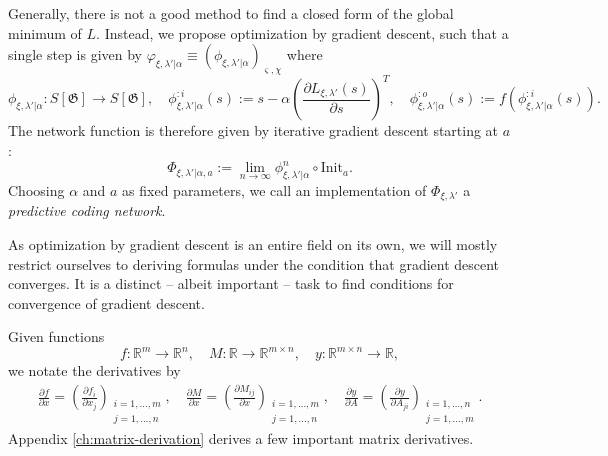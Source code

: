 \documentclass[a4paper,11pt]{report}
\newcommand{\const}{\varsigma} %
\newcommand{\var}{\chi} %
\newcommand{\In}{\text{Init}}
\begin{document}
\begin{Par}
Generally, there is not a good method to find a closed form of the global minimum of $L$. Instead, we propose optimization by gradient descent, such that a single step is given by $\varphi_{\xi,\lambda'|\alpha}\equiv\left(\phi_{\xi,\lambda'|\alpha}\right)_{\const,\var}$ where
\begin{equation}\label{eq:phi}
\phi_{\xi,\lambda'|\alpha}:S[\mathfrak{G}]\to S[\mathfrak{G}],
\quad
\phi_{\xi,\lambda'|\alpha}^{:i}(s):=s-\alpha\left(\frac{\partial L_{\xi,\lambda'}(s)}{\partial s}\right)^T,
\quad
\phi_{\xi,\lambda'|\alpha}^{:o}(s):=f\left(\phi_{\xi,\lambda'|\alpha}^{:i}(s)\right).
\end{equation}
The network function is therefore given by iterative gradient descent starting at $a$:
\begin{equation}
\Phi_{\xi,\lambda'|\alpha,a}:=\lim_{n\to\infty}\phi_{\xi,\lambda'|\alpha}^n\circ\In_a.
\end{equation}
Choosing $\alpha$ and $a$ as fixed parameters, we call an implementation of $\Phi_{\xi,\lambda'}$ a \emph{predictive coding network}.
\end{Par}

\begin{Rem}
As optimization by gradient descent is an entire field on its own, we will mostly restrict ourselves to deriving formulas under the condition that gradient descent converges. It is a distinct -- albeit important -- task to find conditions for convergence of gradient descent.
\end{Rem}

\begin{Not}\label{matrix-derivation-not}
Given functions
\[
f:\mathbb{R}^m\to\mathbb{R}^n,
\quad
M:\mathbb{R}\to\mathbb{R}^{m\times n},
\quad
y:\mathbb{R}^{m\times n}\to\mathbb{R},
\]
we notate the derivatives by
\begin{align*}
\frac{\partial f}{\partial x}=\left(\frac{\partial f_i}{\partial x_j}\right)_{\substack{i=1,\dotsc,m\\j=1,\dotsc,n}},
\quad
\frac{\partial M}{\partial x}=\left(\frac{\partial M_{ij}}{\partial x}\right)_{\substack{i=1,\dotsc,m\\j=1,\dotsc,n}},
\quad
\frac{\partial y}{\partial A}=\left(\frac{\partial y}{\partial A_{ji}}\right)_{\substack{i=1,\dotsc,n\\j=1,\dotsc,m}}.
\end{align*}
Appendix \ref{ch:matrix-derivation} derives a few important matrix derivatives.
\end{Not}
\end{document}
